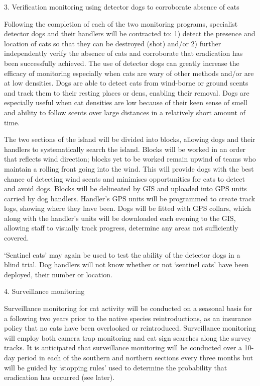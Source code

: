 \documentclass[version=last,
    paper=a4,                               %
    10pt,                                   %
    dvipsnames,
    oneside,                              %
    headings=openany,                       %
    open=any,
    BCOR=7mm,                               %
    DIV=15,     %
]{scrbook}
\begin{document}
3. Verification monitoring using detector dogs to corroborate absence of
cats

Following the completion of each of the two monitoring programs,
specialist detector dogs and their handlers will be contracted to: 1)
detect the presence and location of cats so that they can be destroyed
(shot) and/or 2) further independently verify the absence of cats and
corroborate that eradication has been successfully achieved. The use of
detector dogs can greatly increase the efficacy of monitoring especially
when cats are wary of other methods and/or are at low densities. Dogs
are able to detect cats from wind-borne or ground scents and track them
to their resting places or dens, enabling their removal. Dogs are
especially useful when cat densities are low because of their keen sense
of smell and ability to follow scents over large distances in a
relatively short amount of time.

The two sections of the island will be divided into blocks, allowing
dogs and their handlers to systematically search the island. Blocks will
be worked in an order that reflects wind direction; blocks yet to be
worked remain upwind of teams who maintain a rolling front going into
the wind. This will provide dogs with the best chance of detecting wind
scents and minimises opportunities for cats to detect and avoid dogs.
Blocks will be delineated by GIS and uploaded into GPS units carried by
dog handlers. Handler's GPS units will be programmed to create track
logs, showing where they have been. Dogs will be fitted with GPS
collars, which along with the handler's units will be downloaded each
evening to the GIS, allowing staff to visually track progress, determine
any areas not sufficiently covered.

`Sentinel cats' may again be used to test the ability of the detector
dogs in a blind trial. Dog handlers will not know whether or not
`sentinel cats' have been deployed, their number or location.

4. Surveillance monitoring

Surveillance monitoring for cat activity will be conducted on a seasonal
basis for a following two years prior to the native species
reintroductions, as an insurance policy that no cats have been
overlooked or reintroduced. Surveillance monitoring will employ both
camera trap monitoring and cat sign searches along the survey tracks. It
is anticipated that surveillance monitoring will be conducted over a
10-day period in each of the southern and northern sections every three
months but will be guided by `stopping rules' used to determine the
probability that eradication has occurred (see later).
\end{document}

